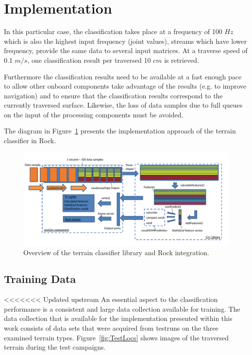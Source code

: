 \documentclass{article}
\begin{document}
\section{Implementation}
In this particular case, the classification takes place at a frequency of 100 $Hz$ which is also the highest input frequency (joint values), streams which have lower frequency, provide the same data to several input matrices. At a traverse speed of 0.1 $m/s$, one classification result per traversed 10 $cm$ is retrieved. 

Furthermore the classification results need to be available at a fast enough pace to allow other onboard components take advantage of the results (e.g. to improve navigation) and to ensure that the classification results correspond to the currently traversed surface. 
Likewise, the loss of data samples due to full queues on the input of the processing components must be avoided. 

The diagram in Figure~\ref{fig:overview} presents the implementation approach of the terrain classifier in Rock.

\begin{figure}[h]
\centering
\includegraphics[width=\textwidth]{../figures/OverviewTC2.pdf}
\caption{\label{fig:overview}Overview of the terrain classifier library and Rock integration.}
\end{figure}

\subsection{Training Data}

<<<<<<< Updated upstream
An essential aspect to the classification performance is a consistent and large data collection available for training. The data collection that is available for the implementation presented within this work consists of data sets that were acquired from testruns on the three examined terrain types. Figure~\ref{fig:TestLocs} shows images of the traversed terrain during the test campaigns.
\end{document}
